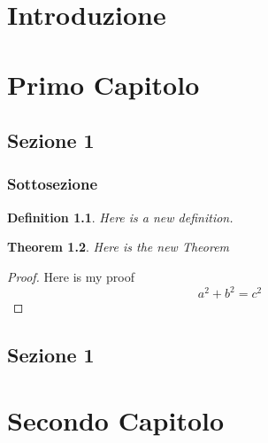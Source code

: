 \documentclass[
    a4paper,
    11pt,
    oneside,
    hidelinks
]{book}
\newtheorem{theorem}{Theorem}[section]			%
\newtheorem{definition}[theorem]{Definition}		%
\begin{document}
\frontmatter %

\tableofcontents %

\chapter*{Introduzione} 

\lipsum[2]

\mainmatter %

\chapter{Primo Capitolo}
\section{Sezione 1}
\lipsum[2]
\subsection{Sottosezione}
\lipsum[2]
\begin{definition}
Here is a new definition.
\end{definition}
\begin{theorem}
Here is the new Theorem
\end{theorem}
\begin{proof}
Here is my proof
\begin{equation}
a^2 + b^2 = c^2
\end{equation}

\end{proof}

\section{Sezione 1}
\lipsum[2]

\chapter{Secondo Capitolo}
\lipsum[2]


%
\end{document}
